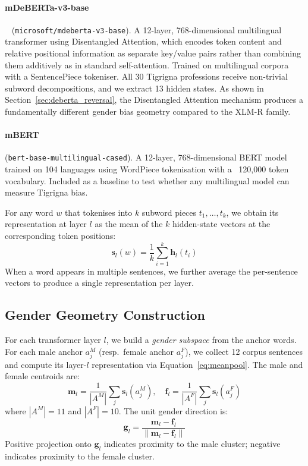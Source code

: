\documentclass[11pt,a4paper]{article}
\begin{document}
\paragraph{mDeBERTa-v3-base}~\cite{he2021deberta} (\texttt{microsoft/mdeberta-v3-base}).
A 12-layer, 768-dimensional multilingual transformer using Disentangled
Attention, which encodes token content and relative positional information as
separate key/value pairs rather than combining them additively as in standard
self-attention. Trained on multilingual corpora with a SentencePiece tokeniser.
All 30 Tigrigna professions receive non-trivial subword decompositions, and we
extract 13 hidden states. As shown in Section~\ref{sec:deberta_reversal}, the
Disentangled Attention mechanism produces a fundamentally different gender bias
geometry compared to the XLM-R family.

\paragraph{mBERT} (\texttt{bert-base-multilingual-cased}).
A 12-layer, 768-dimensional BERT model trained on 104 languages using WordPiece
tokenisation with a ~120{,}000 token vocabulary. Included as a baseline to test
whether any multilingual model can measure Tigrigna bias.

For any word $w$ that tokenises into $k$ subword pieces $t_1, \ldots, t_k$,
we obtain its representation at layer $l$ as the mean of the $k$ hidden-state
vectors at the corresponding token positions:
\begin{equation}
  \mathbf{s}_l(w) = \frac{1}{k} \sum_{i=1}^{k} \mathbf{h}_l(t_i)
  \label{eq:meanpool}
\end{equation}
When a word appears in multiple sentences, we further average the per-sentence
vectors to produce a single representation per layer.

\subsection{Gender Geometry Construction}

For each transformer layer $l$, we build a \emph{gender subspace} from the
anchor words. For each male anchor $a^M_j$ (resp.\ female anchor $a^F_j$), we
collect 12 corpus sentences and compute its layer-$l$ representation via
Equation~\ref{eq:meanpool}. The male and female centroids are:
\begin{equation}
  \mathbf{m}_l = \frac{1}{|A^M|} \sum_{j} \mathbf{s}_l(a^M_j), \quad
  \mathbf{f}_l = \frac{1}{|A^F|} \sum_{j} \mathbf{s}_l(a^F_j)
\end{equation}
where $|A^M|=11$ and $|A^F|=10$. The unit gender direction is:
\begin{equation}
  \mathbf{g}_l = \frac{\mathbf{m}_l - \mathbf{f}_l}
                      {\|\mathbf{m}_l - \mathbf{f}_l\|}
\end{equation}
Positive projection onto $\mathbf{g}_l$ indicates proximity to the male cluster;
negative indicates proximity to the female cluster.
\end{document}
